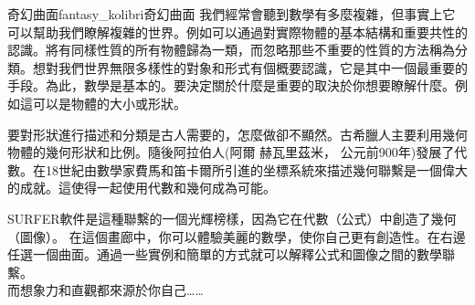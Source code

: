 \begin{surferIntroPage}{奇幻曲面}{fantasy_kolibri}{奇幻曲面}
我們經常會聽到數學有多麼複雜，但事實上它可以幫助我們瞭解複雜的世界。例如可以通過對實際物體的基本結構和重要共性的認識。將有同樣性質的所有物體歸為一類，而忽略那些不重要的性質的方法稱為分類。想對我們世界無限多樣性的對象和形式有個概要認識，它是其中一個最重要的手段。為此，數學是基本的。要決定關於什麼是重要的取決於你想要瞭解什麼。例如這可以是物體的大小或形狀。\\

\vspace{0.4cm}


要對形狀進行描述和分類是古人需要的，怎麼做卻不顯然。古希臘人主要利用幾何物體的幾何形狀和比例。隨後阿拉伯人(阿爾 赫瓦里茲米， 公元前900年)發展了代數。在18世紀由數學家費馬和笛卡爾所引進的坐標系統來描述幾何聯繫是一個偉大的成就。這使得一起使用代數和幾何成為可能。\\

\vspace{0.4cm}

SURFER軟件是這種聯繫的一個光輝榜樣，因為它在代數（公式）中創造了幾何（圖像）。
在這個畫廊中，你可以體驗美麗的數學，使你自己更有創造性。在右邊任選一個曲面。通過一些實例和簡單的方式就可以解釋公式和圖像之間的數學聯繫。\\
而想象力和直觀都來源於你自己……
\end{surferIntroPage}
